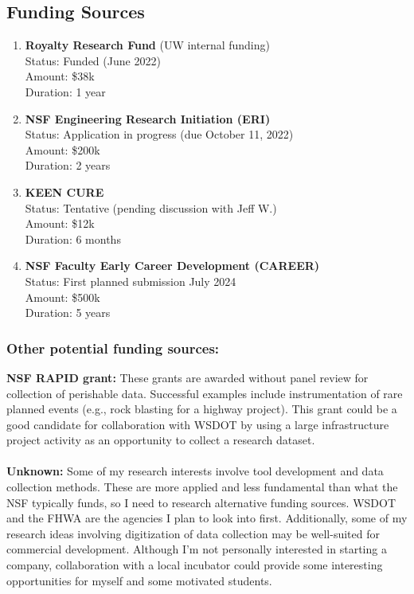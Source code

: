 \documentclass[10pt,letterpaper]{article}
\begin{document}
\subsection*{Funding Sources}
\begin{enumerate}
\item \textbf{Royalty Research Fund} (UW internal funding)\\ 
Status: Funded (June 2022)\\
Amount: \$38k\\
Duration: 1 year
\item \textbf{NSF Engineering Research Initiation (ERI)}\\
Status: Application in progress (due October 11, 2022)\\
Amount: \$200k\\
Duration: 2 years
\item \textbf{KEEN CURE}\\
Status: Tentative (pending discussion with Jeff W.)\\
Amount: \$12k\\
Duration: 6 months
\item \textbf{NSF Faculty Early Career Development (CAREER)}\\
Status: First planned submission July 2024\\
Amount: \$500k\\
Duration: 5 years

\end{enumerate}
\subsubsection*{Other potential funding sources:}

\textbf{NSF RAPID grant:} These grants are awarded without panel review for collection of perishable data. Successful examples include instrumentation of rare planned events (e.g., rock blasting for a highway project). 
This grant could be a good candidate for collaboration with WSDOT by using a large infrastructure project activity as an opportunity to collect a research dataset.
\\
\\
\noindent \textbf{Unknown:} Some of my research interests involve tool development and data collection methods.
These are more applied and less fundamental than what the NSF typically funds, so I need to research alternative funding sources. 
WSDOT and the FHWA are the agencies I plan to look into first.
Additionally, some of my research ideas involving digitization of data collection may be well-suited for commercial development. 
Although I'm not personally interested in starting a company, collaboration with a local incubator could provide some interesting opportunities for myself and some motivated students.
\end{document}
